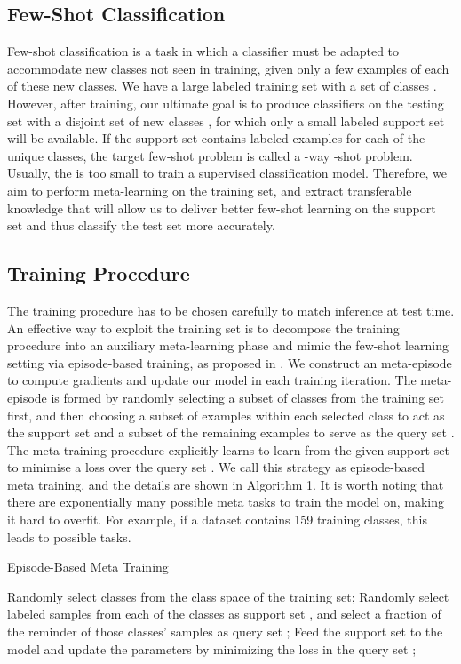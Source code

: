 \documentclass[11pt,a4paper]{article}
\begin{document}
\subsection{Few-Shot Classification}
Few-shot classification \citep{vinyals2016matching,snell2017prototypical} is a task in which a classifier must be adapted to accommodate new classes not seen in training, given only a few examples of each of these new classes. We have a large labeled training set with a set of classes . However, after training, our ultimate goal is to produce classifiers on the testing set with a disjoint set of new classes , for which only a small labeled support set will be available. If the support set contains  labeled examples for each of the  unique classes, the target few-shot problem is called a -way -shot problem. Usually, the  is too small to train a supervised classification model. Therefore, we aim to perform meta-learning on the training set, and extract transferable knowledge that will allow us to deliver better few-shot learning on the support set and thus classify the test set more accurately.

\subsection{Training Procedure}
The training procedure has to be chosen carefully to match inference at test time. An effective way to exploit the training set is to decompose the training procedure into an auxiliary meta-learning phase and mimic the few-shot learning setting via episode-based training, as proposed in \citet{vinyals2016matching}. We construct an meta-episode to compute gradients and update our model in each training iteration. The meta-episode is formed by randomly selecting a subset of classes from the training set first, and then choosing a subset of examples within each selected class to act as the support set  and a subset of the remaining examples to serve as the query set . 
The meta-training procedure explicitly learns to learn from the given support set  to minimise a loss over the query set . We call this strategy as episode-based meta training, and the details are shown in Algorithm 1.
It is worth noting that there are exponentially many possible meta tasks to train the model on, making it hard to overfit. 
For example, if a dataset contains 159 training classes, this leads to  possible  tasks.\\



\begin{algorithm}[t]
\caption{Episode-Based Meta Training}
\begin{algorithmic}[1]
\STATE Randomly select  classes from the class space of the training set;
\STATE Randomly select  labeled samples from each of the  classes as support set 
, and select a fraction of the reminder of those  classes' samples as query set ;
\STATE Feed the support set  to the model and update the parameters by minimizing the loss in the query set ;
\ENDFOR
\label{episode based meta training_alg}
\end{algorithmic}
\end{algorithm}
\end{document}
